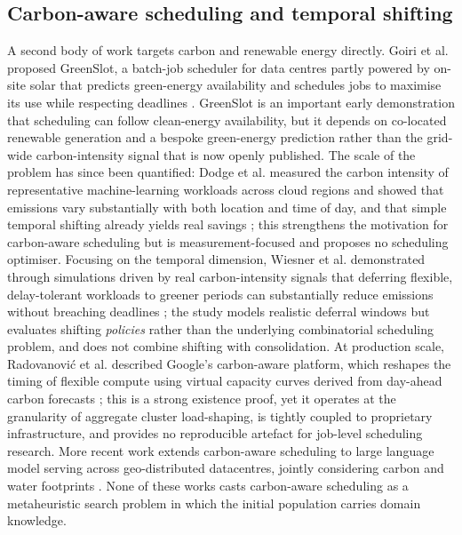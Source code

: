 \documentclass[12pt,a4paper]{article}
\providecommand{\DIFaddtex}[1]{{\protect\color{blue} \sf #1}} %
\providecommand{\DIFaddbegin}{} %
\providecommand{\DIFaddend}{} %
\providecommand{\DIFadd}[1]{\texorpdfstring{\DIFaddtex{#1}}{#1}} %
\providecommand{\DIFaddincludegraphics}[2][]{{\color{blue}\fbox{\DIFOincludegraphics[#1]{#2}}}} %
\DeclareRobustCommand{\DIFaddbegin}{\DIFOaddbegin \let\includegraphics\DIFaddincludegraphics} %
\DeclareRobustCommand{\DIFaddend}{\DIFOaddend \let\includegraphics\DIFOincludegraphics} %
\begin{document}
\subsection{Carbon-aware scheduling and temporal shifting}
A second body of work targets carbon and renewable energy directly. Goiri et al. proposed GreenSlot, a
batch-job scheduler for data centres partly powered by on-site solar that predicts green-energy availability
and schedules jobs to maximise its use while respecting deadlines \cite{goiri2011greenslot}. GreenSlot is an
important early demonstration that scheduling can follow clean-energy availability, but it depends on
co-located renewable generation and a bespoke green-energy prediction rather than the grid-wide
carbon-intensity signal that is now openly published. The scale of the problem has since been quantified:
Dodge et al. measured the carbon intensity of representative machine-learning workloads across cloud regions
and showed that emissions vary substantially with both location and time of day, and that simple temporal
shifting already yields real savings \cite{dodge2022measuring}; this strengthens the motivation for
carbon-aware scheduling but is measurement-focused and proposes no scheduling optimiser. Focusing on the
temporal dimension, Wiesner et al. demonstrated through simulations driven by real carbon-intensity signals
that deferring flexible, delay-tolerant workloads to greener periods can substantially reduce emissions
without breaching deadlines \cite{wiesner2021lets}; the study models realistic deferral windows but evaluates
shifting \emph{policies} rather than the underlying combinatorial scheduling problem, and does not combine
shifting with consolidation. At production scale, Radovanovi\'c et al. described Google's carbon-aware
platform, which reshapes the timing of flexible compute using virtual capacity curves derived from day-ahead
carbon forecasts \cite{radovanovic2023carbon}; this is a strong existence proof, yet it operates at the
granularity of aggregate cluster load-shaping, is tightly coupled to proprietary infrastructure, and provides
no reproducible artefact for job-level scheduling research. \DIFaddbegin \DIFadd{More recent work extends carbon-aware scheduling to
large language model serving across geo-distributed datacentres, jointly considering carbon and water
footprints \cite{moore2025sustainable}. }\DIFaddend None of these works casts carbon-aware scheduling as a metaheuristic
search problem \DIFaddbegin \DIFadd{in which the initial population carries domain knowledge}\DIFaddend .
\end{document}
